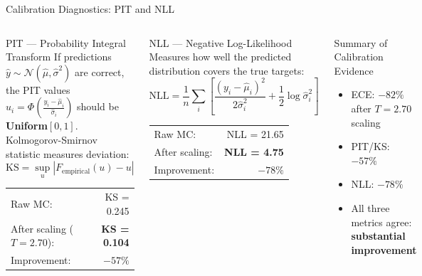 \documentclass[aspectratio=169,10pt]{beamer}
\newcommand{\emphblue}[1]{\textcolor{tumblue}{\textbf{#1}}}
\newcommand{\emphgreen}[1]{\textcolor{tumgreen}{\textbf{#1}}}
\begin{document}
\begin{frame}{Calibration Diagnostics: PIT and NLL}
  \begin{columns}[c]
      \begin{block}{PIT — Probability Integral Transform}
        If predictions $\hat{y} \sim \mathcal{N}(\hat{\mu}, \hat{\sigma}^2)$ are correct,\\
        the PIT values $u_i = \Phi\!\left(\frac{y_i - \hat{\mu}_i}{\hat{\sigma}_i}\right)$
        should be \textbf{Uniform}$[0,1]$.\\[0.4em]
        Kolmogorov-Smirnov statistic measures deviation:
        \[
          \text{KS} = \sup_u |F_{\text{empirical}}(u) - u|
        \]
        \begin{tabular}{lr}
          Raw MC: & KS = 0.245 \\
          After scaling ($T{=}2.70$): & \emphgreen{KS = 0.104} \\
          Improvement: & \emphblue{$-57\%$} \\
        \end{tabular}
      \end{block}
      \begin{block}{NLL — Negative Log-Likelihood}
        Measures how well the predicted distribution covers the true targets:
        \[
          \text{NLL} = \frac{1}{n}\sum_i \left[\frac{(y_i - \hat{\mu}_i)^2}{2\hat{\sigma}_i^2} + \frac{1}{2}\log\hat{\sigma}_i^2\right]
        \]
        \begin{tabular}{lr}
          Raw MC: & NLL = 21.65 \\
          After scaling: & \emphgreen{NLL = 4.75} \\
          Improvement: & \emphblue{$-78\%$} \\
        \end{tabular}
      \end{block}
      \vspace{0.3em}
      \begin{alertblock}{Summary of Calibration Evidence}
        \begin{itemize}
          \item ECE: $-82\%$ after $T=2.70$ scaling
          \item PIT/KS: $-57\%$
          \item NLL: $-78\%$
          \item All three metrics agree: \emphblue{substantial improvement}
        \end{itemize}
      \end{alertblock}
  \end{columns}
\end{frame}
\end{document}
